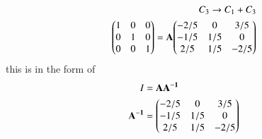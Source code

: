\documentclass[journal,12pt,twocolumn]{IEEEtran}
\begin{document}
\begin{align}
\ {C_3\rightarrow C_1+C_3}\\
{\begin{pmatrix}1 & 0 & 0\\ 0 & 1 & 0\\ 0 & 0 & 1\end{pmatrix}} =\mathbf{A} {\begin{pmatrix}-2/5 & 0 & 3/5\\-1/5 & 1/5 & 0\\2/5 & 1/5 & -2/5\end{pmatrix}}
\end{align}
this is in the form of
\begin{align}
\ I &= \mathbf{A}\mathbf{A^{-1}}\\
\mathbf {A^{-1}} &= {\begin{pmatrix}-2/5 & 0 & 3/5\\-1/5 & 1/5 & 0\\2/5 & 1/5 & -2/5\end{pmatrix}}
\end{align}
\end{document}
